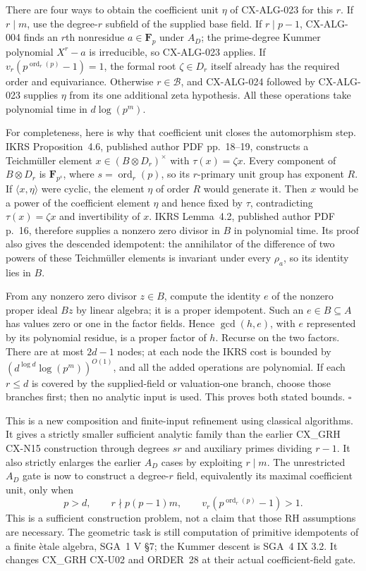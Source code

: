 There are four ways to obtain the coefficient unit $\eta$ of
CX-ALG-023 for this $r$.
If $r\mid m$, use the degree-$r$ subfield of the supplied base field.
If $r\mid p-1$, CX-ALG-004 finds an $r$th nonresidue $a\in\mathbf F_p$
under $A_D$; the prime-degree Kummer polynomial $X^r-a$ is irreducible,
so CX-ALG-023 applies. If $v_r(p^{\operatorname{ord}_r(p)}-1)=1$,
the formal root $\zeta\in D_r$ itself already has the required order
and equivariance. Otherwise $r\in\mathcal B$, and CX-ALG-024 followed
by CX-ALG-023 supplies $\eta$ from its one additional zeta hypothesis.
All these operations take polynomial time in $d\log(p^m)$.

For completeness, here is why that coefficient unit closes the
automorphism step. IKRS Proposition~4.6, published author PDF
pp.~18--19, constructs a Teichm\"uller element
$x\in(B\otimes D_r)^\times$ with
$\tau(x)=\zeta x$. Every component of $B\otimes D_r$ is
$\mathbf F_{p^s}$, where $s=\operatorname{ord}_r(p)$, so its
$r$-primary unit group has exponent $R$.
If $\langle x,\eta\rangle$ were cyclic, the element $\eta$ of
order $R$ would generate it. Then $x$ would be a power of the
coefficient element $\eta$ and hence fixed by $\tau$, contradicting
$\tau(x)=\zeta x$ and invertibility of $x$.
IKRS Lemma~4.2, published author PDF p.~16, therefore supplies a
nonzero zero divisor in $B$ in polynomial time. Its proof also gives
the descended idempotent: the annihilator of the difference of two
powers of these Teichm\"uller elements is invariant under every
$\rho_a$, so its identity lies in $B$.

From any nonzero zero divisor $z\in B$, compute the identity $e$ of
the nonzero proper ideal $Bz$ by linear algebra; it is a proper
idempotent. Such an $e\in B\subseteq A$ has values zero or one in
the factor fields. Hence $\gcd(h,e)$, with $e$ represented by its
polynomial residue, is a proper factor of $h$. Recurse on the two
factors. There are at most $2d-1$ nodes; at each node the IKRS cost
is bounded by $(d^{\log d}\log(p^m))^{O(1)}$, and all the added
operations are polynomial. If each $r\le d$ is covered by the
supplied-field or valuation-one branch, choose those branches first;
then no analytic input is used. This proves both stated bounds.
\hfill$\square$

This is a new composition and finite-input refinement using classical
algorithms. It gives a strictly smaller sufficient analytic family than
the earlier CX\_GRH CX-N15 construction through degrees $sr$ and
auxiliary primes dividing $r-1$. It also strictly enlarges the earlier
$A_D$ cases by exploiting $r\mid m$. The unrestricted $A_D$ gate is
now to construct a degree-$r$ field, equivalently its maximal coefficient
unit, only when
\[
       p>d,\qquad r\nmid p(p-1)m,\qquad
             v_r(p^{\operatorname{ord}_r(p)}-1)>1.
\]
This is a sufficient construction problem, not a claim that those RH
assumptions are necessary. The geometric task is still computation of
primitive idempotents of a finite \`etale algebra, SGA~1 V \S7;
the Kummer descent is SGA~4 IX 3.2. It changes CX\_GRH CX-U02 and
ORDER~28 at their actual coefficient-field gate.

